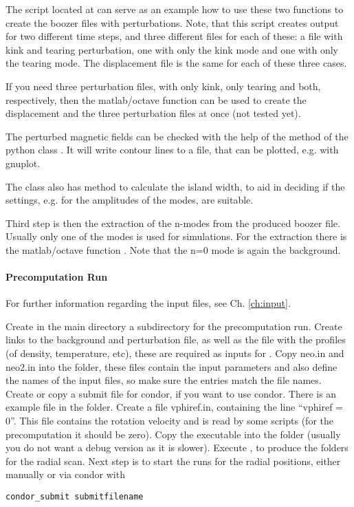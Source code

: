 The script 
located at 
can serve as an example how to use these two functions to create the
boozer files with perturbations. Note, that this script creates output
for two different time steps, and three different files for each of
these: a file with kink and tearing perturbation, one with only the kink
mode and one with only the tearing mode. The displacement file is the
same for each of these three cases.

If you need three perturbation files, with only kink, only tearing and
both, respectively, then the matlab/octave function
 can be used to create the
displacement and the three perturbation files at once (not tested yet).

The perturbed magnetic fields can be checked with the help of the
method  of the python class
. It will write contour lines to a file, that can be
plotted, e.g. with gnuplot.

The class also has method  to
calculate the island width, to aid in
deciding if the settings, e.g. for the amplitudes of the modes, are
suitable.

Third step is then the extraction of the n-modes from the produced
boozer file. Usually only one of the modes is used for simulations.
For the extraction there is the matlab/octave function
.
Note that the n=0 mode is again the background.


\paragraph{Precomputation Run}
For further information regarding the input files, see Ch. \ref{ch:input}.

Create in the main directory a subdirectory for the precomputation run.
Create links to the background and perturbation file, as well as the
file with the profiles (of density, temperature, etc), these are required
as inputs for \neotwo.
Copy neo.in and neo2.in into the folder, these files contain the input
parameters and also define the names of the input files, so make sure
the entries match the file names. Create or copy a submit file
for condor, if you want to use condor. There is an example file in the
 folder. Create a file vphiref.in, containing the line
``vphiref = 0''. This file contains the rotation velocity and is read by
some scripts (for the precomputation it should be zero). Copy the
\neotwo executable into the folder (usually you do not want a debug
version as it is slower). Execute \neotwo, to produce the folders for
the radial scan. Next step is to start the runs for the radial
positions, either manually or via condor with
\begin{verbatim}
condor_submit submitfilename
\end{verbatim}

